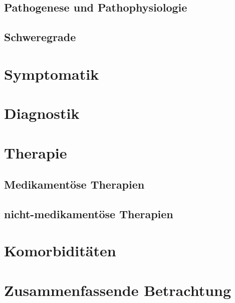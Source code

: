\subsection{Pathogenese und Pathophysiologie}

\subsection{Schweregrade}

\section{Symptomatik}

\section{Diagnostik}

\section{Therapie}

\subsection{Medikamentöse Therapien}

\subsection{nicht-medikamentöse Therapien}

\section{Komorbiditäten}

\section{Zusammenfassende Betrachtung}

\newpage\thispagestyle{empty}